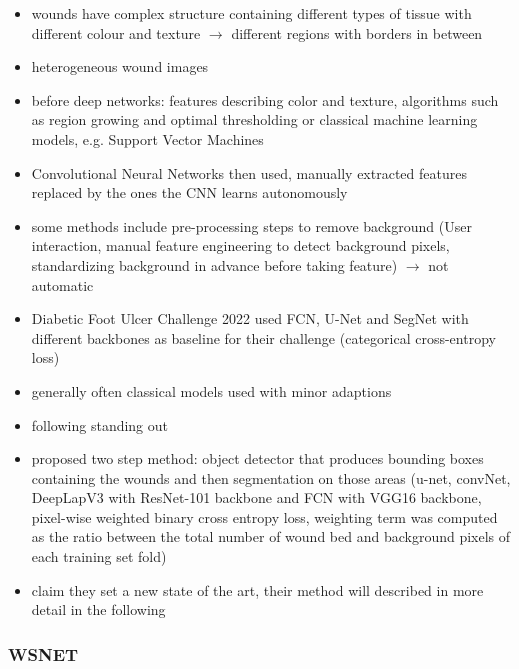\begin{itemize}
	\item wounds have complex structure containing different types of tissue with different colour and texture $\rightarrow$ different regions with borders in between \cite{AhmadFauzi2015}
	\item heterogeneous wound images
\end{itemize}

\begin{itemize}
	\item before deep networks: features describing color and texture, algorithms such as region growing and optimal thresholding or classical machine learning models, e.g. Support Vector Machines \cite{Scebba2022}
	\item Convolutional Neural Networks then used, manually extracted features replaced by the ones the CNN learns autonomously \cite{Scebba2022}
	\item some methods include pre-processing steps to remove background (User interaction, manual feature engineering to detect background pixels, standardizing background in advance before taking feature) $\rightarrow$ not automatic
	\item Diabetic Foot Ulcer Challenge 2022 used FCN, U-Net and SegNet with different backbones as baseline for their challenge (categorical cross-entropy loss) \cite{DFUC2022}
	\item generally often classical models used with minor adaptions
	\item following standing out
	\item \citeauthor{Scebba2022} proposed two step method: object detector that produces bounding boxes containing the wounds and then segmentation on those areas (u-net, convNet, DeepLapV3 with ResNet-101 backbone and FCN with VGG16 backbone, pixel-wise weighted binary cross entropy loss, weighting term was computed as the ratio between the total number of wound bed and background pixels of each training set fold)
	\item \citeauthor{Oota_2023_WACV} claim they set a new state of the art, their method will described in more detail in the following
\end{itemize}


\subsubsection{WSNET}

